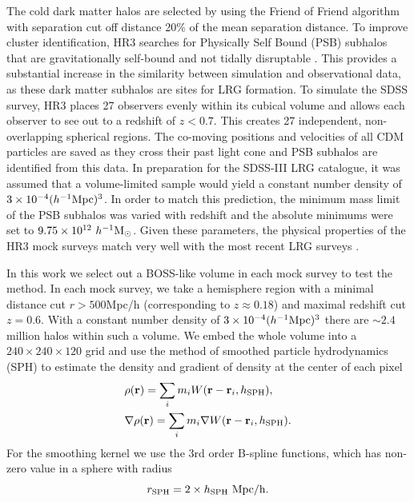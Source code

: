 \documentclass{emulateapj}
\begin{document}
The cold dark matter halos are selected by using the Friend of Friend algorithm
with separation cut off distance 20\% of the mean separation distance. 
To improve cluster identification, HR3 searches for Physically Self Bound (PSB) subhalos 
that are gravitationally self-bound and not tidally disruptable \citep{kim and park 2006}.
This provides a substantial increase in the similarity between simulation and observational data, 
as these dark matter subhalos are sites for LRG formation. 
To simulate the SDSS survey, 
HR3 places 27 observers evenly within its cubical volume and allows each observer to see out to a redshift of $z < 0.7$. 
This creates 27 independent, non-overlapping spherical regions.
The co-moving positions and velocities of all CDM particles are saved as they cross
their past light cone and PSB subhalos are identified from this data. 
In preparation for the SDSS-III LRG catalogue, 
it was assumed that a volume-limited sample would yield a constant number density of $3 \times 10^{-4} (h^{-1}{\rm Mpc})^3$. 
In order to match this prediction, the minimum mass limit of the PSB subhalos was varied with redshift 
and the absolute minimums were set to $9.75 \times 10^{12}~{h^{-1}}{\rm M_{\odot}}$. 
Given these parameters, the physical properties of the HR3 mock surveys match very well with the most recent LRG surveys 
\citep{choi 2010,gott 2009, gott 2008}.

In this work we select out a BOSS-like volume in each mock survey to test the method. 
In each mock survey, we take a hemisphere region with a minimal distance cut $r>500$Mpc/h (corresponding to $z\approx0.18$)
and maximal redshift cut $z=0.6$.
With a constant number density of $3 \times 10^{-4} (h^{-1}{\rm Mpc})^3$ there are $\sim 2.4$ million halos within such a volume.
We embed the whole volume into a $240\times240\times120$ grid
and use the method of smoothed particle hydrodynamics (SPH) to estimate the density and gradient of density at the center of each pixel
\begin{eqnarray}
 &\rho({\bf r}) = \sum_i m_i W({\bf r}-{\bf r}_i,h_{\rm SPH}),\\ 
 &\nabla\rho({\bf r}) = \sum_i m_i \nabla W({\bf r}-{\bf r}_i,h_{\rm SPH}).
\end{eqnarray}
For the smoothing kernel we use the 3rd order B-spline functions,
which has non-zero value in a sphere with radius 
\begin{equation}
r_{\rm SPH}=2\times h_{\rm SPH}\ {\rm Mpc/h}. 
\end{equation}
\end{document}
